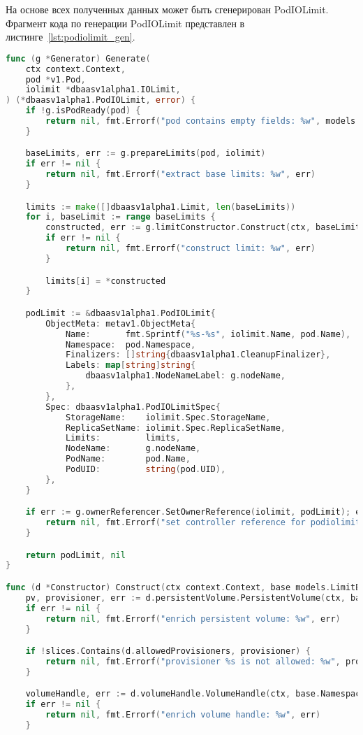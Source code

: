 На основе всех полученных данных может быть сгенерирован PodIOLimit. Фрагмент кода по генерации PodIOLimit представлен в листинге~\ref{lst:podiolimit_gen}.

\begin{lstlisting}[language=Go,label=lst:podiolimit_gen, caption={Генерация PodIOLimit}]
func (g *Generator) Generate(
	ctx context.Context,
	pod *v1.Pod,
	iolimit *dbaasv1alpha1.IOLimit,
) (*dbaasv1alpha1.PodIOLimit, error) {
	if !g.isPodReady(pod) {
		return nil, fmt.Errorf("pod contains empty fields: %w", models.ErrPodIsNotReady)
	}

	baseLimits, err := g.prepareLimits(pod, iolimit)
	if err != nil {
		return nil, fmt.Errorf("extract base limits: %w", err)
	}

	limits := make([]dbaasv1alpha1.Limit, len(baseLimits))
	for i, baseLimit := range baseLimits {
		constructed, err := g.limitConstructor.Construct(ctx, baseLimit)
		if err != nil {
			return nil, fmt.Errorf("construct limit: %w", err)
		}

		limits[i] = *constructed
	}

	podLimit := &dbaasv1alpha1.PodIOLimit{
		ObjectMeta: metav1.ObjectMeta{
			Name:       fmt.Sprintf("%s-%s", iolimit.Name, pod.Name),
			Namespace:  pod.Namespace,
			Finalizers: []string{dbaasv1alpha1.CleanupFinalizer},
			Labels: map[string]string{
				dbaasv1alpha1.NodeNameLabel: g.nodeName,
			},
		},
		Spec: dbaasv1alpha1.PodIOLimitSpec{
			StorageName:    iolimit.Spec.StorageName,
			ReplicaSetName: iolimit.Spec.ReplicaSetName,
			Limits:         limits,
			NodeName:       g.nodeName,
			PodName:        pod.Name,
			PodUID:         string(pod.UID),
		},
	}

	if err := g.ownerReferencer.SetOwnerReference(iolimit, podLimit); err != nil {
		return nil, fmt.Errorf("set controller reference for podiolimit from iolimit: %w", err)
	}

	return podLimit, nil
}

func (d *Constructor) Construct(ctx context.Context, base models.LimitBase) (*dbaasv1alpha1.Limit, error) {
	pv, provisioner, err := d.persistentVolume.PersistentVolume(ctx, base.Namespace, base.PVCName)
	if err != nil {
		return nil, fmt.Errorf("enrich persistent volume: %w", err)
	}

	if !slices.Contains(d.allowedProvisioners, provisioner) {
		return nil, fmt.Errorf("provisioner %s is not allowed: %w", provisioner, models.ErrUnsupportedProvisioner)
	}

	volumeHandle, err := d.volumeHandle.VolumeHandle(ctx, base.Namespace, pv)
	if err != nil {
		return nil, fmt.Errorf("enrich volume handle: %w", err)
	}


\end{lstlisting}
